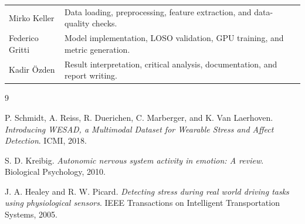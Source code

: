 \documentclass[10pt,a4paper,twocolumn]{article}
\begin{document}
\begin{tabularx}{\linewidth}{lX}
\toprule
Mirko Keller & Data loading, preprocessing, feature extraction, and data-quality checks. \\
Federico Gritti & Model implementation, LOSO validation, GPU training, and metric generation. \\
Kadir {\"O}zden & Result interpretation, critical analysis, documentation, and report writing. \\
\bottomrule
\end{tabularx}

\begin{thebibliography}{9}

P. Schmidt, A. Reiss, R. Duerichen, C. Marberger, and K. Van Laerhoven.
\textit{Introducing WESAD, a Multimodal Dataset for Wearable Stress and Affect Detection}.
ICMI, 2018.

S. D. Kreibig.
\textit{Autonomic nervous system activity in emotion: A review}.
Biological Psychology, 2010.

J. A. Healey and R. W. Picard.
\textit{Detecting stress during real world driving tasks using physiological sensors}.
IEEE Transactions on Intelligent Transportation Systems, 2005.

\end{thebibliography}
\end{document}
